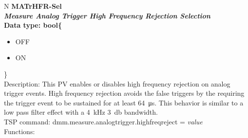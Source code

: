 \documentclass[openany]{article}
\begin{document}
		\begin{tabular}{N}
			\hline
			\bfseries MATrHFR-Sel\label{pv:matrhfr-sel} \\ \hline
			\emph{Measure Analog Trigger High Frequency Rejection Selection} \\
			Data type: bool\{\begin{itemize}[noitemsep]
				\small
				\item[] OFF
				\item[] ON
			\end{itemize}\} \\
			Description: This PV enables or disables high frequency rejection on analog trigger events. High frequency rejection avoids the false triggers by the requiring the trigger event to be sustained for at least \SI{64}{\micro\second}. This behavior is similar to a low pass filter effect with a \SI{4}{\kilo\hertz} \SI{3}{\decibel} bandwidth. \\
			TSP command: dmm.measure.analogtrigger.highfreqreject = \emph{value} \\
			Functions: \\
			\arrayrulecolor{\FuncTableBorderColor}

		\end{tabular}
\end{document}

